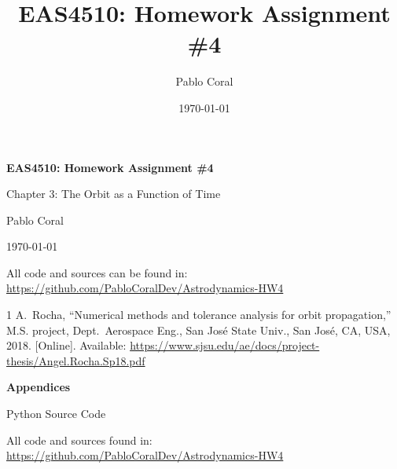 \documentclass[11pt]{article}
\title{EAS4510: Homework Assignment \#4}
\author{Pablo Coral}
\date{\today}
\newcommand{\dividerpage}[3]{%
    \clearpage
    \thispagestyle{empty}
    \begin{center}
        \vspace*{\fill}
        {\Huge\bfseries #1\par}
        \vspace{1cm}
        {\Large #2\par}
        \vspace{1.5cm}
        {\normalsize #3\par}
        \vspace*{\fill}
    \end{center}
    \clearpage
}
\newcommand{\repolink}{\url{https://github.com/PabloCoralDev/Astrodynamics-HW4}}
\begin{document}
\begin{titlepage}
    \centering
    \vspace*{4cm}
    {\LARGE\bfseries EAS4510: Homework Assignment \#4\par}
    \vspace{0.8cm}
    {\Large Chapter 3: The Orbit as a Function of Time\par}
    \vspace{1.5cm}
    {\Large Pablo Coral\par}
    \vspace{0.5cm}
    {\large \today\par}
    \vspace{1cm}
    {\normalsize All code and sources can be found in: \repolink\par}
    \vfill
\end{titlepage}
\clearpage
{}
\setcounter{page}{1}










\begin{thebibliography}{1}
A.~Rocha, ``Numerical methods and tolerance analysis for orbit propagation,'' M.S. project, Dept.\ Aerospace Eng., San Jos\'e State Univ., San Jos\'e, CA, USA, 2018. [Online]. Available: \url{https://www.sjsu.edu/ae/docs/project-thesis/Angel.Rocha.Sp18.pdf}
\end{thebibliography}

\dividerpage{Appendices}{Python Source Code}{All code and sources found in: \repolink}
\appendix

\end{document}
